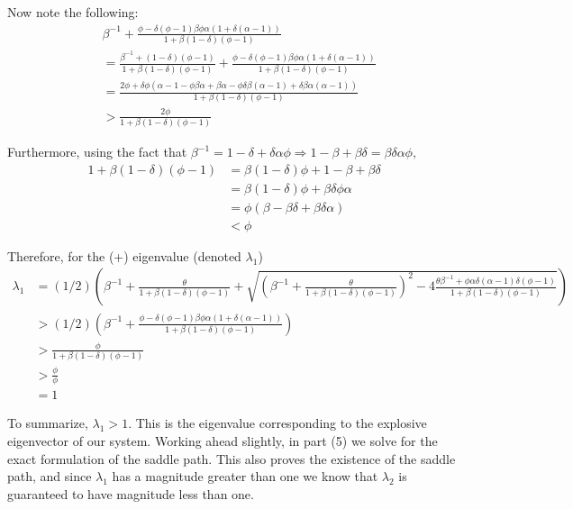 \documentclass[11pt]{article} %
\begin{document}
Now note the following:%
\begin{align*}
&\beta^{-1} +\frac{\phi -  \delta(\phi - 1)\beta \phi \alpha (1 + \delta(\alpha - 1))}{1 + \beta(1-\delta) (\phi - 1)} \\&= \frac{\beta^{-1} + (1-\delta) (\phi - 1)}{1 + \beta(1-\delta) (\phi - 1)}  + \frac{\phi -  \delta(\phi - 1)\beta \phi \alpha (1 + \delta(\alpha - 1))}{1 + \beta(1-\delta) (\phi - 1)} \\
&= \frac{2\phi + \delta \phi (\alpha - 1 - \phi \beta \alpha + \beta \alpha - \phi \delta \beta (\alpha - 1) + \delta\beta\alpha(\alpha - 1))  }{1 + \beta(1-\delta) (\phi - 1)}\\
&> \frac{2\phi }{1 + \beta(1-\delta) (\phi - 1)}
\end{align*}

Furthermore, using the fact that $\beta^{-1} = 1-\delta + \delta\alpha \phi \Rightarrow 1-\beta+\beta\delta = \beta\delta\alpha\phi,$
\begin{align*}
1 + \beta(1-\delta)(\phi - 1) &= \beta(1-\delta)\phi + 1 - \beta + \beta\delta\\
&= \beta(1-\delta)\phi + \beta\delta\phi\alpha\\
&= \phi(\beta - \beta\delta + \beta\delta\alpha)\\
&<\phi
\end{align*}

Therefore, for the (+) eigenvalue (denoted $\lambda_1$)
\begin{align*}
\lambda_1 &= (1/2)\left( \beta^{-1} +\frac{\theta}{1 + \beta(1-\delta) (\phi - 1)} + \sqrt{\left( \beta^{-1} +\frac{\theta}{1 + \beta(1-\delta) (\phi - 1)}\right)^2 - 4\frac{\theta \beta^{-1} + \phi \alpha \delta (\alpha - 1)\delta(\phi - 1)}{1 + \beta(1-\delta) (\phi - 1)}} \right)\\
&>(1/2)\left(\beta^{-1} + \frac{\phi -  \delta(\phi - 1)\beta \phi \alpha (1 + \delta(\alpha - 1))}{1 + \beta(1-\delta) (\phi - 1)}\right)\\
&> \frac{\phi }{1 + \beta(1-\delta) (\phi - 1)}\\
&> \frac{\phi }{\phi}\\
&= 1
\end{align*}

To summarize, $\lambda_1 > 1.$ This is the eigenvalue corresponding to the explosive eigenvector of our system. Working ahead slightly, in part (5) we solve for the exact formulation of the saddle path. This also proves the existence of the saddle path, and since $\lambda_1$ has a magnitude greater than one we know that $\lambda_2$ is guaranteed to have magnitude less than one.
\end{document}
